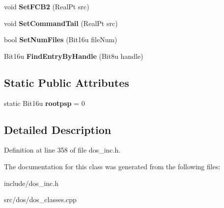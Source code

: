 \begin{DoxyCompactItemize}
\item 
\hypertarget{classDOS__PSP_a4c0066046f23c2d51f36da5f31749299}{void {\bfseries Set\-F\-C\-B2} (Real\-Pt src)}\label{classDOS__PSP_a4c0066046f23c2d51f36da5f31749299}

\item 
\hypertarget{classDOS__PSP_a513c55126b7b22f3fa587f005cbade46}{void {\bfseries Set\-Command\-Tail} (Real\-Pt src)}\label{classDOS__PSP_a513c55126b7b22f3fa587f005cbade46}

\item 
\hypertarget{classDOS__PSP_ac5a10428bbb82e178e67350935882c76}{bool {\bfseries Set\-Num\-Files} (Bit16u file\-Num)}\label{classDOS__PSP_ac5a10428bbb82e178e67350935882c76}

\item 
\hypertarget{classDOS__PSP_a94aa51f3b9eef379d2fbcaf025206a86}{Bit16u {\bfseries Find\-Entry\-By\-Handle} (Bit8u handle)}\label{classDOS__PSP_a94aa51f3b9eef379d2fbcaf025206a86}

\end{DoxyCompactItemize}
\subsection*{Static Public Attributes}
\begin{DoxyCompactItemize}
\item 
\hypertarget{classDOS__PSP_ad46b74f756dae06941329a205ab482fd}{static Bit16u {\bfseries rootpsp} = 0}\label{classDOS__PSP_ad46b74f756dae06941329a205ab482fd}

\end{DoxyCompactItemize}


\subsection{Detailed Description}


Definition at line 358 of file dos\-\_\-inc.\-h.



The documentation for this class was generated from the following files\-:\begin{DoxyCompactItemize}
\item 
include/dos\-\_\-inc.\-h\item 
src/dos/dos\-\_\-classes.\-cpp\end{DoxyCompactItemize}
